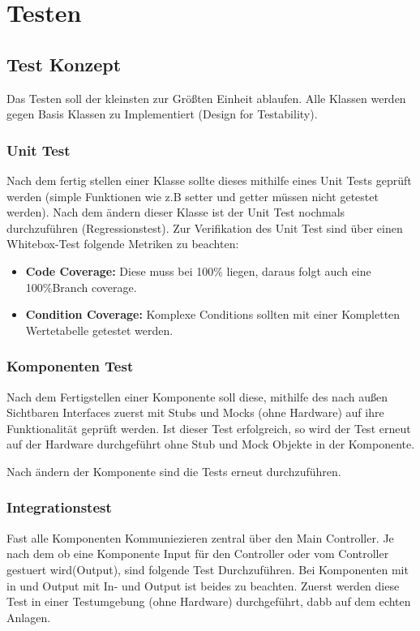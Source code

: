 \chapter{Testen}

\section{Test Konzept}
Das Testen soll der kleinsten zur Größten Einheit ablaufen.
Alle Klassen werden gegen Basis Klassen zu Implementiert (Design for Testability).

\subsection{Unit Test}
Nach dem fertig stellen einer Klasse sollte dieses mithilfe eines Unit Tests geprüft werden (simple Funktionen wie z.B setter und getter müssen nicht getestet werden).
Nach dem ändern dieser Klasse ist der Unit Test nochmals durchzuführen (Regressionstest).
Zur Verifikation des Unit Test sind über einen Whitebox-Test folgende Metriken zu beachten:
\begin{itemize} 
	\item \textbf{Code Coverage:} Diese muss bei 100\% liegen, daraus folgt auch eine 100\%Branch coverage.
	\item\textbf{Condition Coverage:} Komplexe Conditions sollten mit einer Kompletten Wertetabelle getestet werden.
\end{itemize}

\subsection{Komponenten Test}
Nach dem Fertigstellen einer Komponente soll diese, mithilfe des nach außen Sichtbaren Interfaces zuerst mit Stubs und Mocks (ohne Hardware) auf ihre Funktionalität geprüft werden.
Ist dieser Test erfolgreich, so wird der Test erneut auf der Hardware durchgeführt ohne Stub und Mock Objekte in der Komponente. 

Nach ändern der Komponente sind die Tests erneut durchzuführen.

\subsection{Integrationstest}
Fast alle Komponenten Kommuniezieren zentral über den Main Controller.
Je nach dem ob eine Komponente Input für den Controller oder vom Controller gestuert wird(Output), sind folgende Test Durchzuführen.
Bei Komponenten mit in und Output mit In- und Output ist beides zu beachten. Zuerst werden diese Test in einer Testumgebung (ohne Hardware) durchgeführt, 
dabb auf dem echten Anlagen.

